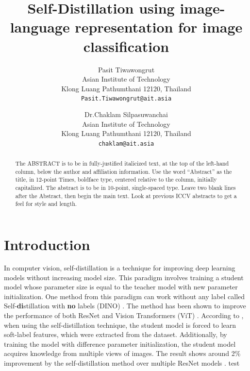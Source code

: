 \documentclass[10pt,twocolumn,letterpaper]{article}
\begin{document}
\title{Self-Distillation using image-language representation for image classification}

\author{Pasit Tiwawongrut\\
Asian Institute of Technology\\
Klong Luang Pathumthani 12120, Thailand\\
{\tt\small Pasit.Tiwawongrut@ait.asia}
\and
Dr.Chaklam Silpasuwanchai\\
Asian Institute of Technology\\
Klong Luang Pathumthani 12120, Thailand\\
{\tt\small chaklam@ait.asia}
}

\maketitle
\ificcvfinal\thispagestyle{empty}\fi

\begin{abstract}
   The ABSTRACT is to be in fully-justified italicized text, at the top
   of the left-hand column, below the author and affiliation
   information. Use the word ``Abstract'' as the title, in 12-point
   Times, boldface type, centered relative to the column, initially
   capitalized. The abstract is to be in 10-point, single-spaced type.
   Leave two blank lines after the Abstract, then begin the main text.
   Look at previous ICCV abstracts to get a feel for style and length.
\end{abstract}

\section{Introduction}

In computer vision, self-distillation \cite{furlanello2018born, zhang2019your, xie2020self} is a technique for improving deep learning models without increasing model size.
This paradigm involves training a student model whose parameter size is equal to the teacher model with new parameter initialization.
One method from this paradigm can work without any label called Self-\textbf{di}stillation with \textbf{no} labels (DINO) \cite{caron2021emerging}.
The method has been shown to improve the performance of both ResNet \cite{he2016deep} and Vision Transformers (ViT) \cite{dosovitskiy2021an}.
According to \cite{allen-zhu2023towards}, when using the self-distillation technique, the student model is forced to learn soft-label features, which were extracted from the dataset. Additionally, by training the model with difference parameter initialization, the student model acquires knowledge from multiple views of images. 
The result shows around 2\% improvement by the self-distillation method over multiple ResNet models \cite{Zagoruyko2016WideResnet}.
test
\end{document}
